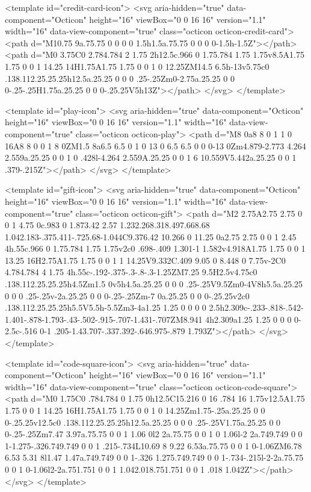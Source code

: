 <template id="credit-card-icon">
  <svg aria-hidden="true" data-component="Octicon" height="16" viewBox="0 0 16 16" version="1.1" width="16" data-view-component="true" class="octicon octicon-credit-card">
    <path d="M10.75 9a.75.75 0 0 0 0 1.5h1.5a.75.75 0 0 0 0-1.5h-1.5Z"></path><path d="M0 3.75C0 2.784.784 2 1.75 2h12.5c.966 0 1.75.784 1.75 1.75v8.5A1.75 1.75 0 0 1 14.25 14H1.75A1.75 1.75 0 0 1 0 12.25ZM14.5 6.5h-13v5.75c0 .138.112.25.25.25h12.5a.25.25 0 0 0 .25-.25Zm0-2.75a.25.25 0 0 0-.25-.25H1.75a.25.25 0 0 0-.25.25V5h13Z"></path>
</svg>
</template>

<template id="play-icon">
  <svg aria-hidden="true" data-component="Octicon" height="16" viewBox="0 0 16 16" version="1.1" width="16" data-view-component="true" class="octicon octicon-play">
    <path d="M8 0a8 8 0 1 1 0 16A8 8 0 0 1 8 0ZM1.5 8a6.5 6.5 0 1 0 13 0 6.5 6.5 0 0 0-13 0Zm4.879-2.773 4.264 2.559a.25.25 0 0 1 0 .428l-4.264 2.559A.25.25 0 0 1 6 10.559V5.442a.25.25 0 0 1 .379-.215Z"></path>
</svg>
</template>

<template id="gift-icon">
  <svg aria-hidden="true" data-component="Octicon" height="16" viewBox="0 0 16 16" version="1.1" width="16" data-view-component="true" class="octicon octicon-gift">
    <path d="M2 2.75A2.75 2.75 0 0 1 4.75 0c.983 0 1.873.42 2.57 1.232.268.318.497.668.68 1.042.183-.375.411-.725.68-1.044C9.376.42 10.266 0 11.25 0a2.75 2.75 0 0 1 2.45 4h.55c.966 0 1.75.784 1.75 1.75v2c0 .698-.409 1.301-1 1.582v4.918A1.75 1.75 0 0 1 13.25 16H2.75A1.75 1.75 0 0 1 1 14.25V9.332C.409 9.05 0 8.448 0 7.75v-2C0 4.784.784 4 1.75 4h.55c-.192-.375-.3-.8-.3-1.25ZM7.25 9.5H2.5v4.75c0 .138.112.25.25.25h4.5Zm1.5 0v5h4.5a.25.25 0 0 0 .25-.25V9.5Zm0-4V8h5.5a.25.25 0 0 0 .25-.25v-2a.25.25 0 0 0-.25-.25Zm-7 0a.25.25 0 0 0-.25.25v2c0 .138.112.25.25.25h5.5V5.5h-5.5Zm3-4a1.25 1.25 0 0 0 0 2.5h2.309c-.233-.818-.542-1.401-.878-1.793-.43-.502-.915-.707-1.431-.707ZM8.941 4h2.309a1.25 1.25 0 0 0 0-2.5c-.516 0-1 .205-1.43.707-.337.392-.646.975-.879 1.793Z"></path>
</svg>
</template>

<template id="code-square-icon">
  <svg aria-hidden="true" data-component="Octicon" height="16" viewBox="0 0 16 16" version="1.1" width="16" data-view-component="true" class="octicon octicon-code-square">
    <path d="M0 1.75C0 .784.784 0 1.75 0h12.5C15.216 0 16 .784 16 1.75v12.5A1.75 1.75 0 0 1 14.25 16H1.75A1.75 1.75 0 0 1 0 14.25Zm1.75-.25a.25.25 0 0 0-.25.25v12.5c0 .138.112.25.25.25h12.5a.25.25 0 0 0 .25-.25V1.75a.25.25 0 0 0-.25-.25Zm7.47 3.97a.75.75 0 0 1 1.06 0l2 2a.75.75 0 0 1 0 1.06l-2 2a.749.749 0 0 1-1.275-.326.749.749 0 0 1 .215-.734L10.69 8 9.22 6.53a.75.75 0 0 1 0-1.06ZM6.78 6.53 5.31 8l1.47 1.47a.749.749 0 0 1-.326 1.275.749.749 0 0 1-.734-.215l-2-2a.75.75 0 0 1 0-1.06l2-2a.751.751 0 0 1 1.042.018.751.751 0 0 1 .018 1.042Z"></path>
</svg>
</template>

